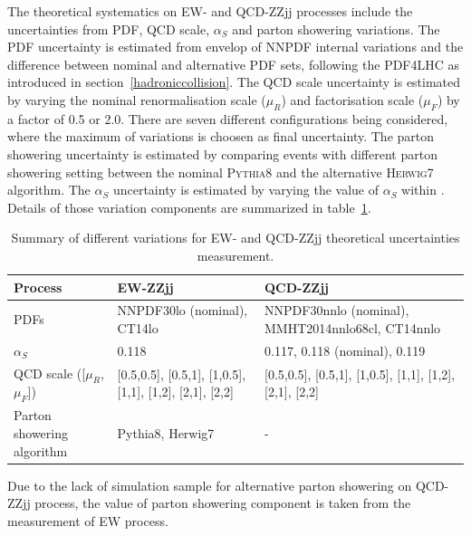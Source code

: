 The theoretical systematics on EW- and QCD-ZZjj processes include the uncertainties from PDF, QCD scale, $\alpha_{S}$ and parton showering variations.
The PDF uncertainty is estimated from envelop of NNPDF internal variations and the difference between nominal and alternative PDF sets, following the PDF4LHC as introduced in section~\ref{hadroniccollision}.
The QCD scale uncertainty is estimated by varying the nominal renormalisation scale ($\mu_{R}$) and factorisation scale ($\mu_{F}$) by a factor of 0.5 or 2.0.
There are seven different configurations being considered, where the maximum of variations is choosen as final uncertainty.
The parton showering uncertainty is estimated by comparing events with different parton showering setting between the nominal \textsc{Pythia8} and the alternative \textsc{Herwig7}\cite{Bellm:2015jjp, Bahr:2008pv} algorithm.
The $\alpha_{S}$ uncertainty is estimated by varying the value of $\alpha_{S}$ within .
Details of those variation components are summarized in table~\ref{tab:syst_theo_uncer}.
\begin{table}[!htb]
\small
\begin{center}
\begin{tabular}{p{5cm}p{5cm}p{5cm}} 
\hline\hline
Process     & EW-ZZjj   & QCD-ZZjj \\
\hline
PDFs        & NNPDF30lo (nominal), CT14lo & NNPDF30nnlo (nominal), MMHT2014nnlo68cl, CT14nnlo \\
\hline
$\alpha_{S}$ & 0.118 & 0.117, 0.118 (nominal), 0.119 \\
\hline
QCD scale ([$\mu_{R}$, $\mu_{F}$]) & [0.5,0.5], [0.5,1], [1,0.5], [1,1], [1,2], [2,1], [2,2] & [0.5,0.5], [0.5,1], [1,0.5], [1,1], [1,2], [2,1], [2,2] \\
\hline 
Parton showering algorithm & Pythia8, Herwig7 & - \\
\hline\hline
\end{tabular}
\caption{
Summary of different variations for EW- and QCD-ZZjj theoretical uncertainties measurement.
}
\label{tab:syst_theo_uncer}
\end{center}
\end{table}
Due to the lack of simulation sample for alternative parton showering on QCD-ZZjj process, 
the value of parton showering component is taken from the measurement of EW process.

